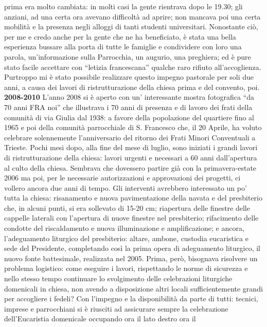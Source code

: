 prima era molto cambiata: in molti casi la gente rientrava dopo le 19.30; gli anziani, ad una certa 
ora avevano difficoltà ad aprire; non mancava poi una certa mobilità e la presenza negli alloggi di 
tanti studenti universitari. 
Nonostante ciò, per me e credo anche per la gente che ne ha beneficiato, è stata una bella esperienza 
bussare alla porta di tutte le famiglie e condividere con loro una parola, un'informazione sulla 
Parrocchia, un augurio, una preghiera; ed è pure stato facile accettare con “letizia francescana” 
qualche raro rifiuto all'accoglienza. Purtroppo mi è stato possibile realizzare questo impegno 
pastorale per soli due anni, a causa dei lavori di ristrutturazione della chiesa prima e del convento, 
poi.
\bigbreak
\textbf{2008-2010}
\medbreak
L'anno 2008 si è aperto con un' interessante mostra fotografica “da 70 anni FRA noi” che 
illustrava i 70 anni di presenza e di lavoro dei frati della comunità di via Giulia dal 1938: a favore 
della popolazione del quartiere fino al 1965 e poi della comunità parrocchiale di S. Francesco che, il 
20 Aprile, ha voluto celebrare solennemente l'anniversario del ritorno dei Frati Minori Conventuali 
a Trieste.
Pochi mesi dopo, alla fine del mese di luglio, sono iniziati i grandi lavori di ristrutturazione della 
chiesa: lavori urgenti e necessari a 60 anni dall'apertura al culto della chiesa.
Sembrava che dovessero partire già con la primavera-estate 2006 ma poi, per le necessarie 
autorizzazioni e approvazioni dei progetti, ci vollero ancora due anni di tempo.
Gli interventi avrebbero interessato un po' tutta la chiesa: risanamento e nuova pavimentazione della 
navata e del presbiterio che, in alcuni punti, si era sollevato di 15-20 cm; riapertura delle finestre 
delle cappelle laterali con l'apertura di nuove finestre nel presbiterio; rifacimento delle condotte del 
riscaldamento e nuova illuminazione e amplificazione; e ancora, l'adeguamento liturgico del 
presbiterio: altare, ambone, custodia eucaristica e sede del Presidente, completando così la prima 
opera di adeguamento liturgico, il nuovo fonte battesimale, realizzata nel 2005.
Prima, però, bisognava risolvere un problema logistico: come eseguire i lavori, rispettando le norme 
di sicurezza e nello stesso tempo continuare lo svolgimento delle celebrazioni liturgiche domenicali 
in chiesa, non avendo a disposizione altri locali sufficientemente grandi per accogliere i fedeli?
Con l'impegno e la disponibilità da parte di tutti: tecnici, imprese e parrocchiani si è riusciti ad 
assicurare sempre la celebrazione dell'Eucaristia domenicale occupando ora il lato destro ora il 

